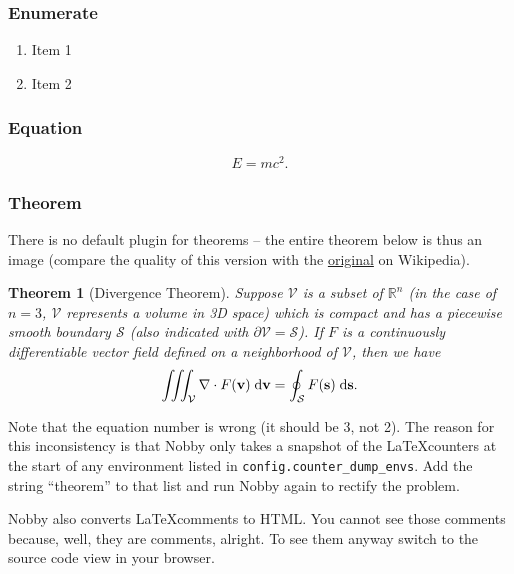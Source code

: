 \documentclass[10pt]{article}
\newcommand{\mvec}[1]{\mathbf{#1}}
\newtheorem{theorem}{Theorem}
\begin{document}
\subsubsection{Enumerate}
\begin{enumerate}
\item Item 1
\item Item 2
\end{enumerate}

\subsubsection{Equation}
\begin{equation}
  \label{eq:rel}
  E = mc^2.
\end{equation}

\subsubsection{Theorem}
There is no default plugin for theorems -- the entire theorem below is
thus an image (compare the quality of this version with the
\href{http://en.wikipedia.org/wiki/Divergence_theorem}{original} on Wikipedia).
\begin{theorem}[Divergence Theorem]
  Suppose $\mathcal{V}$ is a subset of $\mathbb{R}^n$ (in the case of
  $n=3$, $\mathcal{V}$ represents a volume in 3D space) which is
  compact and has a piecewise smooth boundary $\mathcal{S}$ (also
  indicated with $\partial\mathcal{V} = \mathcal{S}$). If $F$ is a
  continuously differentiable vector field defined on a neighborhood
  of $\mathcal{V}$, then we have
  \begin{align}
    \iiint_{\mathcal{V}} \nabla \cdot F(\mvec{v})\; \textnormal{d}\mvec{v}
    = \oint_{\mathcal{S}} F(\mvec{s})\; \textnormal{d}\mvec{s}.
  \end{align}
\end{theorem}

Note that the equation number is wrong (it should be 3, not 2). The
reason for this inconsistency is that Nobby only takes a snapshot of
the \LaTeX counters at the start of any environment listed in
\texttt{config.counter\_dump\_envs}. Add the string ``theorem'' to
that list and run Nobby again to rectify the problem.

Nobby also converts \LaTeX comments to HTML. You cannot see those
comments because, well, they are comments, alright. To see them anyway
switch to the source code view in your browser.
\end{document}

